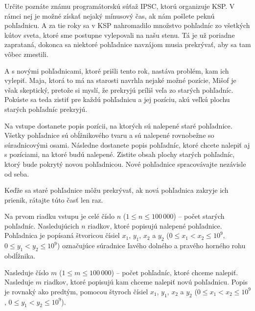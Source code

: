 

\usepackage{tikz}





Určite poznáte známu programátorskú súťaž IPSC, ktorú organizuje KSP. V rámci nej je možné získať
nejaký mínusový čas, ak nám pošlete peknú pohľadnicu. A za tie roky sa v KSP nahromadilo množstvo
pohľadníc zo všetkých kútov sveta, ktoré sme postupne vylepovali na našu stenu. Tá je už poriadne
zaprataná, dokonca sa niektoré pohľadnice navzájom musia prekrývať, aby sa tam vôbec zmestili.

A s novými pohľadnicami, ktoré prišli tento rok, nastáva problém, kam ich vylepiť. Maja, ktorá to má
na starosti navrhla nejaké možné pozície, Mišof je však skeptický, pretože si myslí, že prekryjú
príliš veľa zo starých pohľadníc. Pokúste sa teda zistiť pre každú pohľadnicu a jej pozíciu, akú
veľkú plochu starých pohľadníc prekryjú.


Na vstupe dostanete popis pozícii, na ktorých sú nalepené staré pohľadnice. Všetky pohľadnice sú
obĺžnikového tvaru a sú nalepené rovnobežne so súradnicovými osami. Následne dostanete popis
pohľadníc, ktoré chcete nalepiť aj s pozíciami, na ktoré budú nalepené. Zistite obsah plochy starých
pohľadníc, ktorý bude pokrytý novou pohľadnicou. Nové pohľadnice spracovávajte nezávisle od seba.

Keďže sa staré pohľadnice môžu prekrývať, ak nová pohľadnica zakryje ich prienik, rátajte túto časť
len raz.


Na prvom riadku vstupu je celé číslo $n$ ($1 \leq n \leq 100\,000$) -- počet starých pohľadníc.
Nasledujúcich $n$ riadkov, ktoré popisujú nalepené pohľadnice. Pohľadnica je popísaná štvoricou
čísiel $x_1$, $y_1$, $x_2$ a $y_2$ ($0 \leq x_1 < x_2 \leq 10^9$, $0 \leq y_1 < y_2 \leq 10^9$)
označujúce súradnice ľavého dolného a pravého horného rohu obdĺžnika.

Nasleduje číslo $m$ ($1 \leq m \leq 100\,000$) -- počet pohľadníc, ktoré chceme nalepiť. Nasleduje
$m$ riadkov, ktoré popisujú kam chceme nalepiť novú pohľadnicu. Popis je rovnaký ako predtým,
pomocou štyroch čísiel $x_1$, $y_1$, $x_2$ a $y_2$ ($0 \leq x_1 < x_2 \leq 10^9$, $0 \leq y_1 < y_2
\leq 10^9$).


